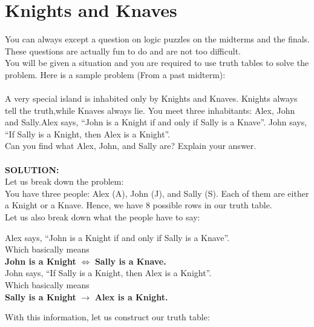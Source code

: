\section{Knights and Knaves}
You can always except a question on logic puzzles on the midterms and the
finals. These questions are actually fun to do and are not too difficult. \\
You will be given a situation and you are required to use truth tables to solve
the problem. Here is a sample problem (From a past midterm):
\\ \\

A very special island is inhabited only by Knights and Knaves. Knights always
tell the truth,while Knaves always lie. You meet three inhabitants: Alex, John
and Sally.Alex says, “John is a Knight if and only if Sally is a Knave”. John
says, “If Sally is a Knight, then Alex is a Knight”. \\
\indent Can you find what Alex, John, and Sally are? Explain your answer.
\\ \\
\noindent \textbf{SOLUTION:} \\
Let us break down the problem: \\
You have three people: Alex (A), John (J), and Sally (S). Each of them are
either a Knight or a Knave. Hence, we have 8 possible rows in our truth table.
\\
Let us also break down what the people have to say:
\begin{center}
    Alex says, “John is a Knight if and only if Sally is a Knave”. \\
    Which basically means \\
    \textbf{John is a Knight} $\Leftrightarrow$ \textbf{Sally is a Knave.} \\
   John says, “If Sally is a Knight, then Alex is a Knight”.\\
   Which basically means \\
   \textbf{Sally is a Knight} $\rightarrow$ \textbf{Alex is a Knight.}
\end{center}
With this information, let us construct our truth table:

